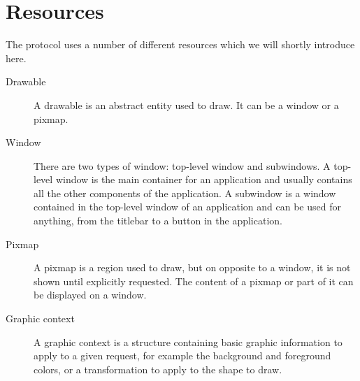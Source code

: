 \section{Resources}
The protocol uses a number of different resources which we will shortly 
introduce here.
\begin{description}
\item[Drawable] A drawable is an abstract entity used to draw. It can be a window or a pixmap.
\item[Window] There are two types of window: top-level window and subwindows. 
  A top-level window is the main container for an application and 
  usually contains all the other components of the application.
  A subwindow is a window contained in the top-level window of an application 
  and can be used for anything, from the titlebar to a button in the application.
\item[Pixmap] A pixmap is a region used to draw, but on opposite to a window, 
  it is not shown until explicitly requested. The content of a pixmap 
  or part of it can be displayed on a window.
\item[Graphic context] A graphic context is a structure containing basic graphic 
  information to apply to a given request, for example the background and 
  foreground colors, or a transformation to apply to the shape to draw.
\end{description}
